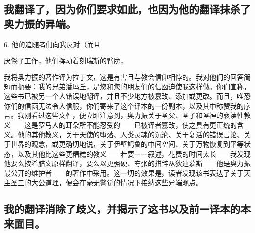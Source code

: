 \subsection{我翻译了，因为你们要求如此，也因为他的翻译抹杀了奥力振的异端。}

6. 他的追随者们向我反对（而且\par

厌倦了工作，\newline{}他们挥动着刻瑞斯的臂膀，\par

我将奥力振的著作译为拉丁文，这是有害且与教会信仰相悖的。我对他们的回答简短而扼要：我的兄弟潘玛丘，是您和您的朋友们的信函迫使我这样做。你们宣称，这些书已被另一个人错误地翻译，并且不少地方被篡改、添加或更改。而且，唯恐你们的信函无法令人信服，你们寄来了这个译本的一份副本，以及其中称赞我的序言。我刚看过这些文件，便立即注意到，奥力振关于圣父、圣子和圣神的亵渎性教义——这是罗马人的耳朵所不能忍受的——已被译者篡改，使之具有更正统的含义。他的其他教义，关于天使的堕落、人类灵魂的沉沦、关于复活的错误言论、关于世界的观念，或更确切地说，关于伊壁鸠鲁的中间空间、关于万物恢复到平等状态，以及其他比这些更糟糕的教义——若要一一叙述，花费的时间太长——我发现他要么按希腊文原样翻译，要么以更强硬、夸张的措辞从狄迪慕斯——他是奥力振最公开的维护者——的著作中采用。这一切的效果是，读者发现该书表达了关于天主圣三的大公道理，便会在毫无警觉的情况下接纳这些异端观点。\par


\subsection{我的翻译消除了歧义，并揭示了这书以及前一译本的本来面目。}

